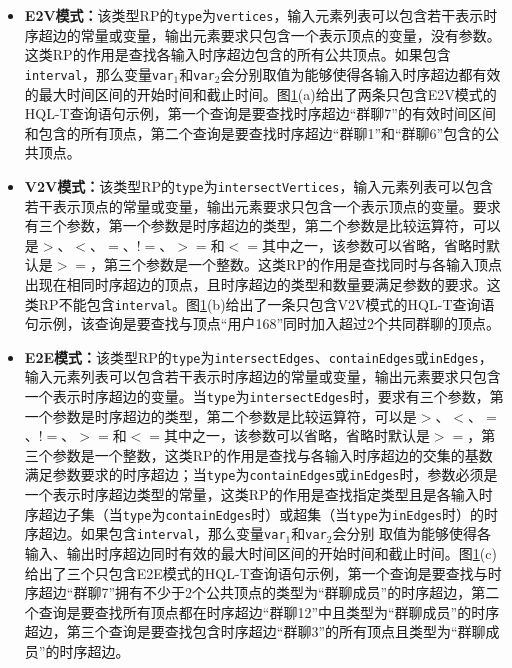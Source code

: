 \begin{figure}[!htb]
\label{hql2}
\end{figure}

\begin{itemize}
\item \textbf{E2V模式：}该类型RP的\texttt{type}为\texttt{vertices}，输入元素列表可以包含若干表示时序超边的常量或变量，输出元素要求只包含一个表示顶点的变量，没有参数。这类RP的作用是查找各输入时序超边包含的所有公共顶点。如果包含\texttt{interval}，那么变量\texttt{var$_1$}和\texttt{var$_2$}会分别取值为能够使得各输入时序超边都有效的最大时间区间的开始时间和截止时间。图\ref{hql2}(a)给出了两条只包含E2V模式的HQL-T查询语句示例，第一个查询是要查找时序超边“群聊7”的有效时间区间和包含的所有顶点，第二个查询是要查找时序超边“群聊1”和“群聊6”包含的公共顶点。
\item \textbf{V2V模式：}该类型RP的\texttt{type}为\texttt{intersectVertices}，输入元素列表可以包含若干表示顶点的常量或变量，输出元素要求只包含一个表示顶点的变量。要求有三个参数，第一个参数是时序超边的类型，第二个参数是比较运算符，可以是$>$、$<$、$=$、$!=$、$>=$和$<=$其中之一，该参数可以省略，省略时默认是$>=$，第三个参数是一个整数。这类RP的作用是查找同时与各输入顶点出现在相同时序超边的顶点，且时序超边的类型和数量要满足参数的要求。这类RP不能包含\texttt{interval}。图\ref{hql2}(b)给出了一条只包含V2V模式的HQL-T查询语句示例，该查询是要查找与顶点“用户168”同时加入超过2个共同群聊的顶点。
\item \textbf{E2E模式：}该类型RP的\texttt{type}为\texttt{intersectEdges}、\texttt{containEdges}或\texttt{inEdges}，输入元素列表可以包含若干表示时序超边的常量或变量，输出元素要求只包含一个表示时序超边的变量。当\texttt{type}为\texttt{intersectEdges}时，要求有三个参数，第一个参数是时序超边的类型，第二个参数是比较运算符，可以是$>$、$<$、$=$、$!=$、$>=$和$<=$其中之一，该参数可以省略，省略时默认是$>=$，第三个参数是一个整数，这类RP的作用是查找与各输入时序超边的交集的基数满足参数要求的时序超边；当\texttt{type}为\texttt{containEdges}或\texttt{inEdges}时，参数必须是一个表示时序超边类型的常量，这类RP的作用是查找指定类型且是各输入时序超边子集（当\texttt{type}为\texttt{containEdges}时）或超集（当\texttt{type}为\texttt{inEdges}时）的时序超边。如果包含\texttt{interval}，那么变量\texttt{var$_1$}和\texttt{var$_2$}会分别
取值为能够使得各输入、输出时序超边同时有效的最大时间区间的开始时间和截止时间。图\ref{hql2}(c)给出了三个只包含E2E模式的HQL-T查询语句示例，第一个查询是要查找与时序超边“群聊7”拥有不少于2个公共顶点的类型为“群聊成员”的时序超边，第二个查询是要查找所有顶点都在时序超边“群聊12”中且类型为“群聊成员”的时序超边，第三个查询是要查找包含时序超边“群聊3”的所有顶点且类型为“群聊成员”的时序超边。
\end{itemize}

